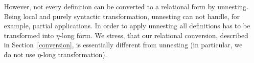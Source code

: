 However, not every definition can be converted to a relational form by unnesting. Being local and purely syntactic
transformation, unnesting can not handle, for example, partial applications. In order to apply unnesting all 
definitions has to be transformed into $\eta$-long form. We stress, that our relational conversion, described in 
Section~\ref{conversion}, is essentially different from unnesting (in particular, we do not use $\eta$-long transformation).









